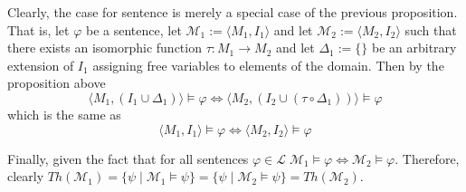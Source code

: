 \documentclass[11pt,a4paper]{article}
\begin{document}
Clearly, the case for sentence is merely a special case of the previous proposition. That is,
let $\varphi$ be a sentence, let $\mathcal{M}_1 := \langle M_1, I_1\rangle$ and let $\mathcal{M}_2 := \langle M_2, I_2\rangle$ such that there exists an isomorphic function $\tau : M_1 \to M_2$ and let $\Delta_1:= \{\}$ be an arbitrary extension of $I_1$ assigning free variables to elements of the domain. Then by the proposition above 
\begin{equation*}
\langle M_1, (I_1 \cup \Delta_1) \rangle \models \varphi \iff \langle M_2, (I_2 \cup (\tau \circ \Delta_1)) \rangle \models \varphi
\end{equation*} 
which is the same as
\begin{equation*}
\langle M_1, I_1 \rangle \models \varphi \iff \langle M_2, I_2 \rangle \models \varphi
\end{equation*} 

Finally, given the fact that for all sentences $ \varphi \in \mathcal{L} \; \mathcal{M}_1 \models \varphi \Leftrightarrow \mathcal{M}_2 \models \varphi$. 
Therefore, clearly $Th(\mathcal{M}_1)= \{\psi \mid \mathcal{M}_1\models  \psi \}=  \{\psi \mid \mathcal{M}_2\models  \psi \} =Th(\mathcal{M}_2)$.\\
\end{document}

